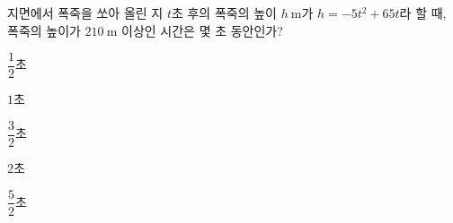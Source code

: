 지면에서 폭죽을 쏘아 올린 지 $t$초 후의 폭죽의 높이 $h\ \mathrm{m}$가 $h=-5t^2+65t$라 할 때, 폭죽의 높이가 $210\ \mathrm{m}$ 이상인 시간은 몇 초 동안인가?
\begin{choices32}{\rule[-3ex]{0pt}{8ex}$\dfrac{1}{2}$초}{\rule[-3ex]{0pt}{8ex}$1$초}{\rule[-3ex]{0pt}{8ex}$\dfrac{3}{2}$초}{\rule[-3ex]{0pt}{8ex}$2$초}{\rule[-3ex]{0pt}{8ex}$\dfrac{5}{2}$초}\end{choices32}
